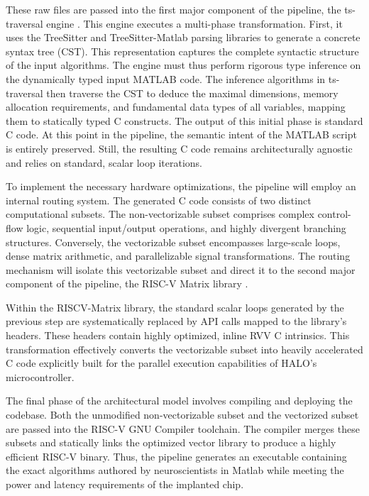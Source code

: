These raw files are passed into the first major component of the pipeline, the ts-traversal engine \cite{ts}. This engine executes a multi-phase transformation. First, it uses the TreeSitter and TreeSitter-Matlab parsing libraries to generate a concrete syntax tree (CST). This representation captures the complete syntactic structure of the input algorithms. The engine must thus perform rigorous type inference on the dynamically typed input MATLAB code. The inference algorithms in ts-traversal then traverse the CST to deduce the maximal dimensions, memory allocation requirements, and fundamental data types of all variables, mapping them to statically typed C constructs. The output of this initial phase is standard C code. At this point in the pipeline, the semantic intent of the MATLAB script is entirely preserved. Still, the resulting C code remains architecturally agnostic and relies on standard, scalar loop iterations. 

To implement the necessary hardware optimizations, the pipeline will employ an internal routing system.
The generated C code consists of two distinct computational subsets. The non-vectorizable subset comprises complex control-flow logic, sequential input/output operations, and highly divergent branching structures. Conversely, the vectorizable subset encompasses large-scale loops, dense matrix arithmetic, and parallelizable signal transformations. The routing mechanism will isolate this vectorizable subset and direct it to the second major component of the pipeline, the RISC-V Matrix library \cite{riscvmatrix}.


Within the RISCV-Matrix library, the standard scalar loops generated by the previous step are systematically replaced by API calls mapped to the library's headers. These headers contain highly optimized, inline RVV C intrinsics. This transformation effectively converts the vectorizable subset into heavily accelerated C code explicitly built for the parallel execution capabilities of HALO's microcontroller.

The final phase of the architectural model involves compiling and deploying the codebase. Both the unmodified non-vectorizable subset and the vectorized subset are passed into the RISC-V GNU Compiler toolchain. The compiler merges these subsets and statically links the optimized vector library to produce a highly efficient RISC-V binary. Thus, the pipeline generates an executable containing the exact algorithms authored by neuroscientists in Matlab while meeting the power and latency requirements of the implanted chip. 

